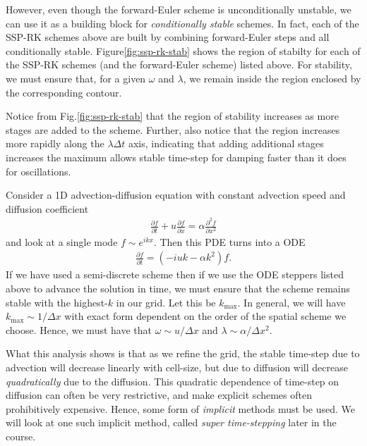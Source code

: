 \documentclass[12pt]{article}
\theoremstyle{definition}
\theoremstyle{definition}
\theoremstyle{definition}
\newcommand{\pfrac}[2]{\frac{\partial #1}{\partial #2}}
\newcommand{\pfracc}[2]{\frac{\partial^2 #1}{\partial #2^2}}
\newcommand{\mvec}[1]{\mathbf{#1}}
\begin{document}
However, even though the forward-Euler scheme is unconditionally
unstable, we can use it as a building block for \emph{conditionally
  stable} schemes. In fact, each of the SSP-RK schemes above are built
by combining forward-Euler steps and all conditionally
stable. Figure\thinspace\ref{fig:ssp-rk-stab} shows the region of
stabilty for each of the SSP-RK schemes (and the forward-Euler scheme)
listed above. For stability, we must ensure that, for a given $\omega$
and $\lambda$, we remain inside the region enclosed by the
corresponding contour.

Notice from Fig.\thinspace\ref{fig:ssp-rk-stab} that the region of
stability increases as more stages are added to the scheme. Further,
also notice that the region increases more rapidly along the
$\lambda \Delta t$ axis, indicating that adding additional stages
increases the maximum allows stable time-step for damping faster
than it does for oscillations.

Consider a 1D advection-diffusion equation with constant advection
speed and diffusion coefficient
\begin{align}
  \pfrac{f}{t} + u\pfrac{f}{x} = \alpha\pfracc{f}{x}
\end{align}
and look at a single mode $f \sim e^{ikx}$. Then this PDE turns into a
ODE
\begin{align}
  \pfrac{f}{t} = (-iuk - \alpha k^2) f.
\end{align}
If we have used a semi-discrete scheme then if we use the ODE steppers
listed above to advance the solution in time, we must ensure that the
scheme remains stable with the highest-$k$ in our grid.  Let this be
$k_{\mathrm{max}}$. In general, we will have
$k_{\mathrm{max}} \sim 1/\Delta x$ with exact form dependent on the
order of the spatial scheme we choose. Hence, we must have that
$\omega \sim u/\Delta x$ and $\lambda \sim \alpha/\Delta x^2$.

What this analysis shows is that as we refine the grid, the stable
time-step due to advection will decrease linearly with cell-size, but
due to diffusion will decrease \emph{quadratically} due to the
diffusion. This quadratic dependence of time-step on diffusion can
often be very restrictive, and make explicit schemes often
prohibitively expensive. Hence, some form of \emph{implicit} methods
must be used. We will look at one such implicit method, called
\emph{super time-stepping} later in the course.


\end{document}
